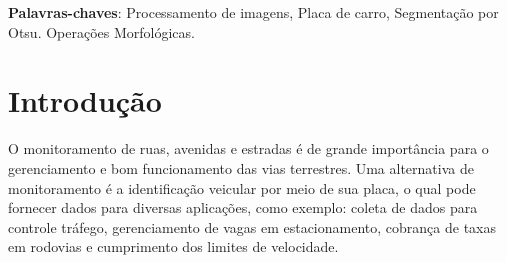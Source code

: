 \documentclass[
	12pt,				%
    oneside,			%
	a4paper,			%
	english,			%
	french,				%
	spanish,			%
	brazil,				%
	]{abntex2}
\begin{document}
\begin{resumo}

 







 \vspace{\onelineskip}
    
 \noindent
 \textbf{Palavras-chaves}: Processamento de imagens, Placa de carro, Segmentação por Otsu. Operações Morfológicas.
\end{resumo} %


\listoffigures* %
\cleardoublepage %

\tableofcontents*


\textual


\chapter{Introdução} 


O monitoramento de ruas, avenidas e estradas é de grande importância para o gerenciamento e bom funcionamento das vias terrestres. Uma alternativa de monitoramento é a identificação veicular por meio de sua placa, o qual pode fornecer dados para diversas aplicações, como exemplo: coleta de dados para controle tráfego, gerenciamento de vagas em estacionamento, cobrança de taxas em rodovias e cumprimento dos limites de velocidade.
\end{document}
